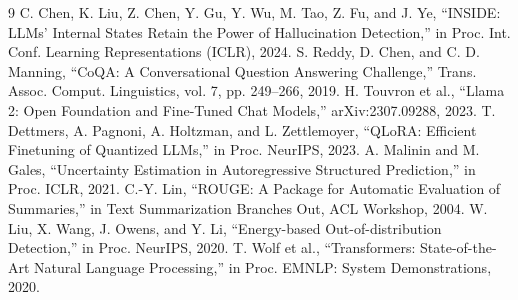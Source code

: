 \documentclass[journal]{IEEEtran}
\begin{document}
\begin{thebibliography}{9}
 C. Chen, K. Liu, Z. Chen, Y. Gu, Y. Wu, M. Tao, Z. Fu, and J. Ye, ``INSIDE: LLMs' Internal States Retain the Power of Hallucination Detection,'' in Proc. Int. Conf. Learning Representations (ICLR), 2024.
 S. Reddy, D. Chen, and C. D. Manning, ``CoQA: A Conversational Question Answering Challenge,'' Trans. Assoc. Comput. Linguistics, vol. 7, pp. 249--266, 2019.
 H. Touvron et al., ``Llama 2: Open Foundation and Fine-Tuned Chat Models,'' arXiv:2307.09288, 2023.
 T. Dettmers, A. Pagnoni, A. Holtzman, and L. Zettlemoyer, ``QLoRA: Efficient Finetuning of Quantized LLMs,'' in Proc. NeurIPS, 2023.
 A. Malinin and M. Gales, ``Uncertainty Estimation in Autoregressive Structured Prediction,'' in Proc. ICLR, 2021.
 C.-Y. Lin, ``ROUGE: A Package for Automatic Evaluation of Summaries,'' in Text Summarization Branches Out, ACL Workshop, 2004.
 W. Liu, X. Wang, J. Owens, and Y. Li, ``Energy-based Out-of-distribution Detection,'' in Proc. NeurIPS, 2020.
 T. Wolf et al., ``Transformers: State-of-the-Art Natural Language Processing,'' in Proc. EMNLP: System Demonstrations, 2020.
\end{thebibliography}
\end{document}
